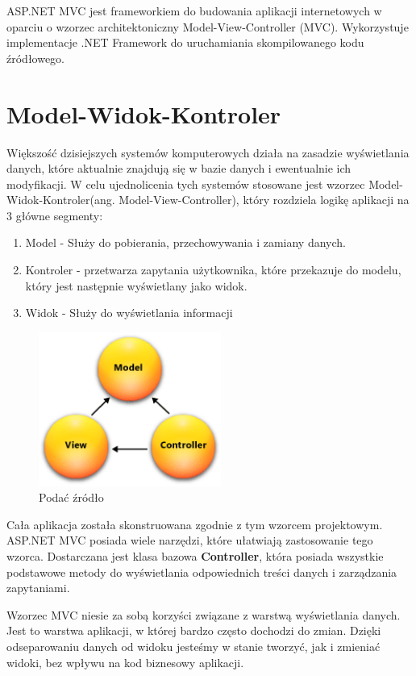 ASP.NET MVC jest frameworkiem do budowania aplikacji internetowych w oparciu o wzorzec architektoniczny Model-View-Controller (MVC). Wykorzystuje implementacje .NET Framework do uruchamiania skompilowanego kodu źródłowego.


\section{Model-Widok-Kontroler}

Większość dzisiejszych systemów komputerowych działa na zasadzie wyświetlania danych, które aktualnie znajdują się w bazie danych i ewentualnie ich modyfikacji. W celu ujednolicenia tych systemów stosowane jest wzorzec Model-Widok-Kontroler(ang. Model-View-Controller), który rozdziela logikę aplikacji na 3 główne segmenty:
\begin{enumerate}
	\item Model - Służy do pobierania, przechowywania i zamiany danych.
	\item Kontroler - przetwarza zapytania użytkownika, które przekazuje do modelu, który jest następnie wyświetlany jako widok.
	\item Widok - Służy do wyświetlania informacji 
\end{enumerate}

\begin{figure}[h]
	\centering
	\includegraphics[height=50.5mm]{images/mvc.png}
	 \caption{Podać źródło}
\end{figure}

Cała aplikacja została skonstruowana zgodnie z tym wzorcem projektowym. ASP.NET MVC posiada wiele narzędzi, które ułatwiają zastosowanie tego wzorca. Dostarczana jest klasa bazowa \textbf{Controller}, która posiada wszystkie podstawowe metody do wyświetlania odpowiednich treści danych i zarządzania zapytaniami.

Wzorzec MVC niesie za sobą korzyści związane z warstwą wyświetlania danych. Jest to warstwa aplikacji, w której bardzo często dochodzi do zmian. Dzięki odseparowaniu danych od widoku jesteśmy w stanie tworzyć, jak i zmieniać widoki, bez wpływu na kod biznesowy aplikacji.

